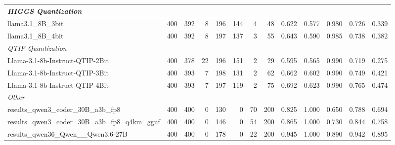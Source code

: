 \begin{table}[htbp]
{\begin{tabular}{lrrrrrrrrrrrr}
    \midrule
    \multicolumn{13}{l}{\textit{HIGGS Quantization}} \\
    \midrule
    llama3.1\_8B\_3bit & 400 & 392 & 8 & 196 & 144 & 4 & 48 & 0.622 & 0.577 & 0.980 & 0.726 & 0.339 \\
    llama3.1\_8B\_4bit & 400 & 392 & 8 & 197 & 137 & 3 & 55 & 0.643 & 0.590 & 0.985 & 0.738 & 0.382 \\
    \midrule
    \multicolumn{13}{l}{\textit{QTIP Quantization}} \\
    \midrule
    Llama-3.1-8b-Instruct-QTIP-2Bit & 400 & 378 & 22 & 196 & 151 & 2 & 29 & 0.595 & 0.565 & 0.990 & 0.719 & 0.275 \\
    Llama-3.1-8b-Instruct-QTIP-3Bit & 400 & 393 & 7 & 198 & 131 & 2 & 62 & 0.662 & 0.602 & 0.990 & 0.749 & 0.421 \\
    Llama-3.1-8b-Instruct-QTIP-4Bit & 400 & 393 & 7 & 197 & 119 & 2 & 75 & 0.692 & 0.623 & 0.990 & 0.765 & 0.474 \\
    \midrule
    \multicolumn{13}{l}{\textit{Other}} \\
    \midrule
    results\_qwen3\_coder\_30B\_a3b\_fp8 & 400 & 400 & 0 & 130 & 0 & 70 & 200 & 0.825 & 1.000 & 0.650 & 0.788 & 0.694 \\
    results\_qwen3\_coder\_30B\_a3b\_fp8\_q4km\_gguf & 400 & 400 & 0 & 146 & 0 & 54 & 200 & 0.865 & 1.000 & 0.730 & 0.844 & 0.758 \\
    results\_qwen36\_Qwen\_\_Qwen3.6-27B & 400 & 400 & 0 & 178 & 0 & 22 & 200 & 0.945 & 1.000 & 0.890 & 0.942 & 0.895 \\
    \bottomrule
  \end{tabular}
  }
\end{table}

